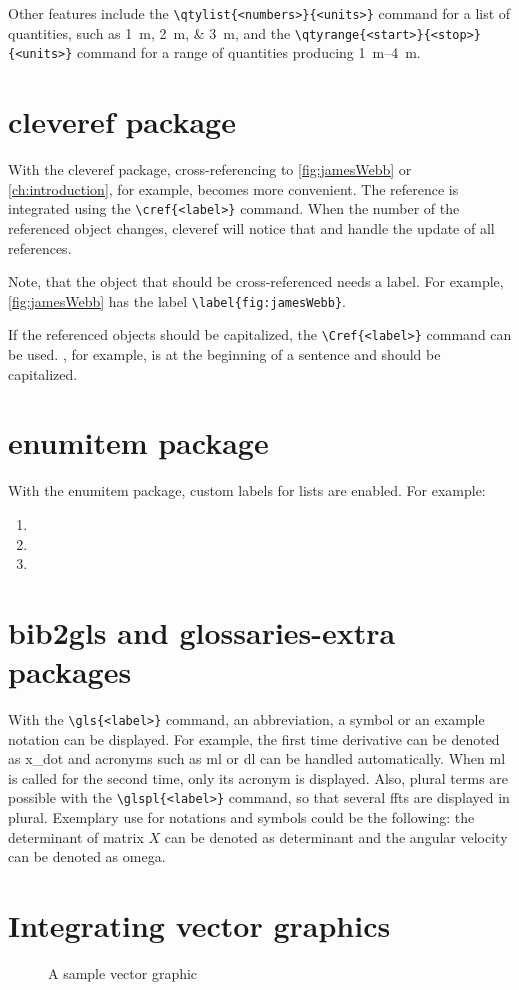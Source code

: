 Other features include the \verb|\qtylist{<numbers>}{<units>}| command for a list of quantities, such as \qtylist{1; 2; 3}{\meter}, and the \verb|\qtyrange{<start>}{<stop>}{<units>}| command for a range of quantities producing \qtyrange{1}{4}{\meter}.
%
\section{cleveref package}%
\label{sec:cleveref}
With the cleveref package, cross-referencing to \cref{fig:jamesWebb} or \cref{ch:introduction}, for example, becomes more convenient. The reference is integrated using the \verb|\cref{<label>}| command. When the number of the referenced object changes, cleveref will notice that and handle the update of all references. 

Note, that the object that should be cross-referenced needs a label. For example, \cref{fig:jamesWebb} has the label \verb|\label{fig:jamesWebb}|.

If the referenced objects should be capitalized, the \verb|\Cref{<label>}| command can be used. , for example, is at the beginning of a sentence and should be capitalized. 
%
\section{enumitem package}%
\label{sec:enumitem}
With the enumitem package, custom labels for lists are enabled. For example:
\begin{enumerate}[leftmargin=*, align=left,start=1,label={\bfseries L\arabic*}]%
	\item \lipsum[0-1]
	\item \lipsum[0-1]
	\item \lipsum[0-1]
\end{enumerate}
%
\section{bib2gls and glossaries-extra packages}%
\label{sec:gls}
With the \verb|\gls{<label>}| command, an abbreviation, a symbol or an example notation can be displayed. For example, the first time derivative can be denoted as \gls{x_dot} and acronyms such as \gls{ml} or \gls{dl} can be handled automatically. When \gls{ml} is called for the second time, only its acronym is displayed. Also, plural terms are possible with the \verb|\glspl{<label>}| command, so that several \glspl{fft} are displayed in plural. Exemplary use for notations and symbols could be the following: the determinant of matrix $X$ can be denoted as \gls{determinant} and the angular velocity can be denoted as \gls{omega}. 

\section{Integrating vector graphics}%
\label{sec:svg}
\lipsum[0-3]
\begin{figure}
	\centering
	
	\caption{A sample vector graphic}
	\label{fig:plot}
\end{figure} 	
